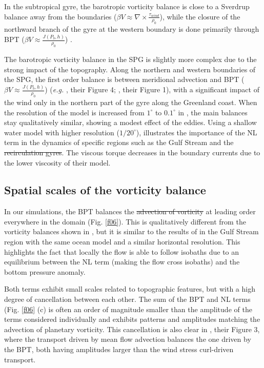 \documentclass[os, manuscript]{copernicus}
\providecommand{\DIFadd}[1]{{\protect\color{blue}\uwave{#1}}} %
\providecommand{\DIFdel}[1]{{\protect\color{red}\sout{#1}}}                      %
\providecommand{\DIFaddbegin}{} %
\providecommand{\DIFaddend}{} %
\providecommand{\DIFdelbegin}{} %
\providecommand{\DIFdelend}{} %
\begin{document}
In the subtropical gyre, the barotropic vorticity balance is close to a Sverdrup balance away from the boundaries ($\beta V \approx \nabla \times \frac{\tau _{wind}}{\rho_{0}}$), while the closure of the northward branch of the gyre at the western boundary is done primarily through BPT ($\beta V \approx \frac{J(P_b,h)}{\rho _0}$)  \citep{schoonover2016}.

The barotropic vorticity balance in the SPG is slightly more complex due to the strong impact of the topography. Along the northern and western boundaries of the SPG, the first order balance is between meridional advection and BPT ($\beta V \approx \frac{J(P_b,h)}{\rho _0}$) (\textit{e.g.} \citet{hughes2001}, their Figure 4; \citet{yeager2015}, their Figure 1), with a significant impact of the wind only in the northern part of the gyre along the Greenland coast. When the resolution of the model is increased from $1^{\circ}$ to $0.1^{\circ}$ in \citet{yeager2015}, the main balances stay qualitatively similar, showing a modest effect of the eddies. Using a shallow water model with higher resolution ($1/20^{\circ}$), \cite{wang2017} illustrates the importance of the NL term in the dynamics of specific regions such as the Gulf Stream and the \DIFdelbegin \DIFdel{recirculation gyres}\DIFdelend \DIFaddbegin \DIFadd{Labrador recirculation in the SPG}\DIFaddend . The viscous torque decreases in the boundary currents due to the lower viscosity of their model.

\subsection{Spatial scales of the vorticity balance}

In our simulations, the BPT balances the \DIFdelbegin \DIFdel{advection of vorticity }\DIFdelend \DIFaddbegin \DIFadd{nonlinear term }\DIFaddend at leading order everywhere in the domain  (Fig. \ref{f06}). This is qualitatively different from the vorticity balances shown in \citet{yeager2015}, but it is similar to the results of \citet{gula2015} in the Gulf Stream region with the same ocean model and a similar horizontal resolution. This highlights the fact that locally the flow is able to follow isobaths due to an equilibrium between the NL term (making the flow cross isobaths) and the bottom pressure anomaly.

Both terms exhibit small scales related to topographic features, but with a high degree of cancellation between each other. The sum of the BPT and NL terms (Fig. \ref{f06} (c) is often an order of magnitude smaller than the amplitude of the terms considered individually and exhibits patterns and amplitudes matching the advection of planetary vorticity. This cancellation is also clear in \cite{wang2017}, their Figure 3, where the transport driven by mean flow advection balances the one driven by the BPT, both having amplitudes larger than the wind stress curl-driven transport.
\end{document}
